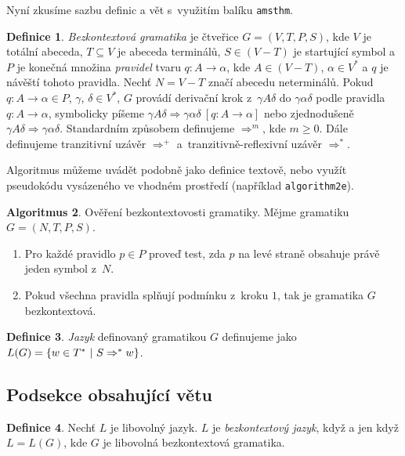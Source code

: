 \documentclass[11pt,a4paper,titlepage,twocolumn]{article}
\theoremstyle{definition}
\newtheorem{defi}{Definice}[section]
\newtheorem{algo}[defi]{Algoritmus}
\begin{document}
	Nyní zkusíme sazbu definic a vět s~využitím balíku \texttt{amsthm}.

	\begin{defi} \label{definice1.1}
		\textit{Bezkontextová gramatika} je čtveřice $G=(V,T,P,S)$, kde $V$ je totální abeceda, 
		$T\subseteq V$ je abeceda terminálů, $S\in(V-T)$ je startující symbol a~$P$ je konečná 
		množina \emph{pravidel} tvaru $q:A\rightarrow \alpha$, kde $A\in(V-T)$, $\alpha \in V^*$ a $q$ je návěští 
		tohoto pravidla. Nechť $N=V-T$ značí abecedu neterminálů. 
		Pokud $q:A\rightarrow \alpha \in P$, $\gamma$, $\delta \in V^*$, $G$ provádí derivační 
		krok z~$\gamma A\delta$ do $\gamma \alpha \delta$ podle pravidla $q:A \rightarrow \alpha$, symbolicky 
		píšeme $\gamma A\delta \Rightarrow \gamma \alpha \delta\ [q:A \rightarrow \alpha]$ nebo 
		zjednodušeně $\gamma A \delta \Rightarrow \gamma \alpha \delta$. Standardním způsobem definujeme 
		$\Rightarrow^m$, kde $m\geq 0$. Dále definujeme tranzitivní uzávěr $\Rightarrow^+$ 
		a~tranzitivně-reflexivní uzávěr $\Rightarrow^*$.
		\smallskip

		Algoritmus můžeme uvádět podobně jako definice textově, nebo využít pseudokódu vysázeného ve 
		vhodném prostředí (například \texttt{algorithm2e}).
	\end{defi}

	\begin{algo}
		Ověření bezkontextovosti gramatiky. Mějme gramatiku $G=(N,T,P,S)$.
		\begin{enumerate}
			\item Pro každé pravidlo $p \in P$ proveď test, zda $p$ na levé straně obsahuje právě jeden symbol z~$N$.
			\item Pokud všechna pravidla splňují podmínku z~kroku $1$, tak je gramatika $G$ bezkontextová.
		\end{enumerate}
	\end{algo}

	\begin{defi}
		\emph{Jazyk} definovaný gramatikou $G$ definujeme jako $L(G)=\{\mathnormal{w} \in T^*\ |\ S \Rightarrow^* \mathnormal{w}\}$.
	\end{defi}

	\subsection{Podsekce obsahující větu}
		\begin{defi}
			Nechť $L$ je libovolný jazyk. $L$ je \emph{bezkontextový jazyk}, když a jen když $L=L(G)$, kde $G$ je 
			libovolná bezkontextová gramatika.
		\end{defi}
\end{document}
